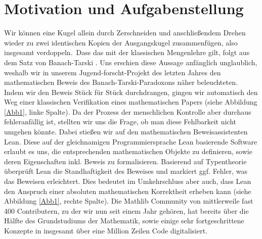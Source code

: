 \documentclass[hidelinks]{article}
\begin{document}
    \section{Motivation und Aufgabenstellung}
    \glqq Wir können eine Kugel allein durch Zerschneiden und anschließendem Drehen wieder zu zwei identischen Kopien der Ausgangskugel zusammenfügen, also insgesamt verdoppeln.\grqq~Dass das mit der klassischen Mengenlehre gilt, folgt aus dem Satz von Banach-Tarski \autocite{noauthor_banach-tarski-paradoxon_2024}. Uns erschien diese Aussage anfänglich unglaublich, weshalb wir in unserem Jugend-forscht-Projekt des letzten Jahres den mathematischen Beweis des Banach-Tarski-Paradoxons näher beleuchteten.
    Indem wir den Beweis Stück für Stück durchdrangen, gingen wir automatisch den Weg einer klassischen Verifikation eines mathematischen Papers (siehe Abbildung \ref{Abb1}, linke Spalte). Da der Prozess der menschlichen Kontrolle aber durchaus fehleranfällig ist, stellten wir uns die Frage, ob man diese Fehlbarkeit nicht umgehen könnte. Dabei stießen wir auf den mathematischen Beweisassistenten Lean. Diese auf der gleichnamigen Programmiersprache Lean basierende Software erlaubt es uns, die entsprechenden mathematischen Objekte zu definieren, sowie deren Eigenschaften inkl. Beweis zu formalisieren. Basierend auf Typentheorie überprüft Lean die Standhaftigkeit des Beweises und markiert ggf. Fehler, was das Beweisen erleichtert. Dies bedeutet im Umkehrschluss aber auch, dass Lean den Anspruch einer absoluten mathematischen Korrektheit erheben kann (siehe Abbildung \ref{Abb1}, rechte Spalte). Die Mathlib Community von mittlerweile fast 400 Contributern, zu der wir nun seit einem Jahr gehören, hat bereits über die Hälfte des Grundstudiums der Mathematik, sowie einige sehr fortgeschrittene Konzepte in insgesamt über eine Million Zeilen Code digitalisiert.
\end{document}
